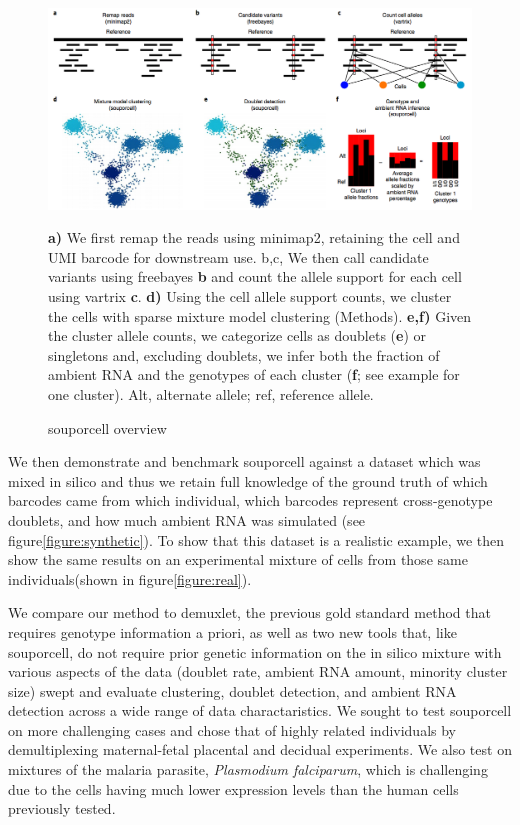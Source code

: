 \begin{figure}[th!]


\begin{centering}
\caption{souporcell overview}\label{fig:souporcell}

\includegraphics[width=\textwidth]{main.png} 

\par{\textbf{a)} We first remap the reads using minimap2, retaining the cell and UMI barcode for downstream use. b,c, We then call
candidate variants using freebayes \textbf{b} and count the allele support for each cell using vartrix \textbf{c}. \textbf{d)} Using the cell allele support counts, we cluster the cells with sparse mixture model clustering (Methods). \textbf{e,f)} Given the cluster allele counts, we categorize cells as doublets (\textbf{e}) or singletons and,
excluding doublets, we infer both the fraction of ambient RNA and the genotypes of each cluster (\textbf{f}; see example for one cluster). Alt, alternate allele;
ref, reference allele.}
\end{centering}
\end{figure}
\par{
We then demonstrate and benchmark souporcell against a dataset which was mixed in silico and thus we retain full knowledge of the ground truth of which barcodes came from which individual, which barcodes represent cross-genotype doublets, and how much ambient RNA was simulated (see figure\ref{figure:synthetic}). To show that this dataset is a realistic example, we then show the same results on an experimental mixture of cells from those same individuals(shown in figure\ref{figure:real}).
}
\par{
We compare our method to demuxlet, the previous gold standard method that requires genotype information a priori, as well as two new tools that, like souporcell, do not require prior genetic information\cite{vireo}\cite{scsplit} on the in silico mixture with various aspects of the data (doublet rate, ambient RNA amount, minority cluster size) swept and evaluate clustering, doublet detection, and ambient RNA detection across a wide range of data charactaristics. We sought to test souporcell on more challenging cases and chose that of highly related individuals by demultiplexing maternal-fetal placental and decidual experiments. We also test on mixtures of the malaria parasite, \textit{Plasmodium falciparum}, which is challenging due to the cells having much lower expression levels than the human cells previously tested.
}
